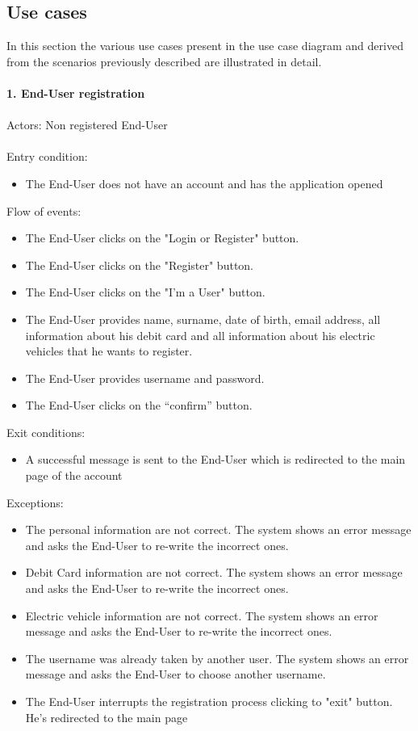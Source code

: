 \documentclass[a4paper]{report}
\begin{document}
\subsection{Use cases}
In this section the various use cases present in the use case diagram and derived from the scenarios previously described are illustrated in detail.\\ \\
\textbf{1. End-User registration}\label{uc:1}
\\
\\
Actors: Non registered End-User\\ \\
Entry condition: 
\begin{itemize}
\item The End-User does not have an account and has the application opened
\end{itemize}
Flow of events:
\begin{itemize}
\item The End-User clicks on the "Login or Register" button.
\item The End-User clicks on the "Register" button.
\item The End-User clicks on the "I'm a User" button.
\item The End-User provides name, surname, date of birth, email address, all information about his debit card and all information about his electric vehicles that he wants to register.
\item The End-User provides username and password. 
\item The End-User clicks on the “confirm” button.
\end{itemize}
Exit conditions: 
\begin{itemize}
\item A successful message is sent to the End-User which is redirected to the main page of the account 
\end{itemize}
Exceptions: 
\begin{itemize}
\item The personal information are not correct. The system shows an error message and asks the End-User to re-write the incorrect ones.
\item Debit Card information are not correct. The system shows an error message and asks the End-User to re-write the incorrect ones.
\item Electric vehicle information are not correct. The system shows an error message and asks the End-User to re-write the incorrect ones.
\item The username was already taken by another user. The system shows an error message and asks the End-User to choose another username.
\item The End-User interrupts the registration process clicking to "exit" button. He's redirected to the main page
\end{itemize}
\end{document}
